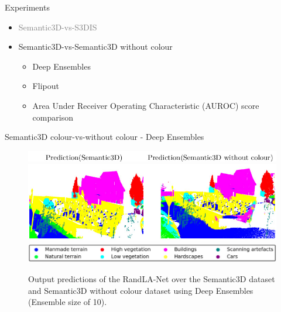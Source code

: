 \documentclass[aspectratio=169]{beamer}
\begin{document}
\begin{frame}[noframenumbering]{Experiments}
    \begin{itemize}
        \item \textcolor{gray}{Semantic3D-vs-S3DIS}
        
        \item Semantic3D-vs-Semantic3D without colour
        \begin{itemize}
            \item Deep Ensembles
            \item Flipout
            \item Area Under Receiver Operating Characteristic (AUROC) score comparison
        \end{itemize}
    \end{itemize}
\end{frame}
\begin{frame}{Semantic3D colour-vs-without colour - Deep Ensembles}
    \begin{figure}
        \centering
        \includegraphics[scale=0.5]{images/ood2/top_legend_ood2.jpg}
        \includegraphics[scale=0.5]{images/ood2/Sem3d_OOD2_DE.jpg}
        \includegraphics[scale=0.25]{images/legend.jpg}
        \caption{Output predictions of the RandLA-Net over the Semantic3D dataset and Semantic3D without
        colour dataset using Deep Ensembles (Ensemble size of 10).}
        \label{fig:DE_ood2_op}
    \end{figure}
\end{frame}
\end{document}
